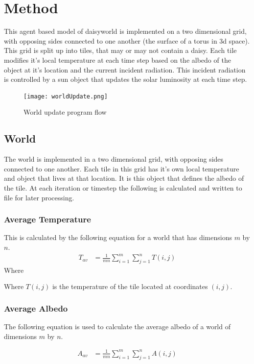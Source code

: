 \documentclass[12pt]{article}
\begin{document}
\section{Method}
This agent based model of daisyworld is implemented on a two
dimensional grid, with opposing sides connected to one another (the
surface of a torus in 3d space). This grid is split up into tiles,
that may or may not contain a daisy. Each tile modifies it's local
temperature at each time step based on the albedo of the object at
it's location and the current incident radiation. This incident
radiation is controlled by a sun object that updates the solar
luminosity at each time step.
\begin{figure}[h!]
  \centering
  \texttt{[image: worldUpdate.png]}
  \caption{World update program flow}
  \label{fig:worldUpdate}
\end{figure}

\subsection{World} The world is implemented in a two dimensional grid,
with opposing sides connected to one another. Each tile in this grid
has it's own local temperature and object that lives at that
location. It is this object that defines the albedo of the tile. At
each iteration or timestep the following is calculated and written to
file for later processing.

\subsubsection{Average Temperature}
This is calculated by the following equation for a world that has
dimensions $m$ by $n$.
\begin{align}
  T_{av} &= \frac{1}{mn}\sum\limits_{i=1}^m\sum\limits_{j=1}^nT(i,j)
\end{align}
Where


Where $T(i,j)$ is the temperature of the tile located at coordinates
$(i,j)$.

\subsubsection{Average Albedo}
The following equation is used to calculate the average albedo of a
world of dimensions $m$ by $n$.

\begin{align}
  A_{av} &= \frac{1}{mn}\sum\limits_{i=1}^m\sum\limits_{j=1}^nA(i,j)
\end{align}
\end{document}
